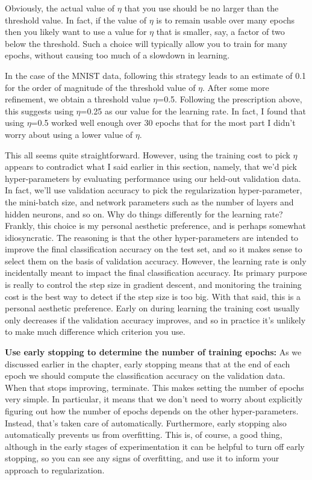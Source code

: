 Obviously, the actual value of $\eta$ that you use should be no larger than the threshold value. In fact, if the value of $\eta$ is to remain usable over many epochs then you likely want to use a value for $\eta$ that is smaller, say, a factor of two below the threshold. Such a choice will typically allow you to train for many epochs, without causing too much of a slowdown in learning.

In the case of the MNIST data, following this strategy leads to an estimate of 0.1 for the order of magnitude of the threshold value of $\eta$. After some more refinement, we obtain a threshold value $\eta$=0.5. Following the prescription above, this suggests using $\eta$=0.25 as our value for the learning rate. In fact, I found that using $\eta$=0.5 worked well enough over 30 epochs that for the most part I didn't worry about using a lower value of $\eta$.

This all seems quite straightforward. However, using the training cost to pick $\eta$ appears to contradict what I said earlier in this section, namely, that we'd pick hyper-parameters by evaluating performance using our held-out validation data. In fact, we'll use validation accuracy to pick the regularization hyper-parameter, the mini-batch size, and network parameters such as the number of layers and hidden neurons, and so on. Why do things differently for the learning rate? Frankly, this choice is my personal aesthetic preference, and is perhaps somewhat idiosyncratic. The reasoning is that the other hyper-parameters are intended to improve the final classification accuracy on the test set, and so it makes sense to select them on the basis of validation accuracy. However, the learning rate is only incidentally meant to impact the final classification accuracy. Its primary purpose is really to control the step size in gradient descent, and monitoring the training cost is the best way to detect if the step size is too big. With that said, this is a personal aesthetic preference. Early on during learning the training cost usually only decreases if the validation accuracy improves, and so in practice it's unlikely to make much difference which criterion you use.

\textbf{Use early stopping to determine the number of training epochs:\label{page:Useearlystopping}} As we discussed earlier in the chapter, early stopping means that at the end of each epoch we should compute the classification accuracy on the validation data. When that stops improving, terminate. This makes setting the number of epochs very simple. In particular, it means that we don't need to worry about explicitly figuring out how the number of epochs depends on the other hyper-parameters. Instead, that's taken care of automatically. Furthermore, early stopping also automatically prevents us from overfitting. This is, of course, a good thing, although in the early stages of experimentation it can be helpful to turn off early stopping, so you can see any signs of overfitting, and use it to inform your approach to regularization.

